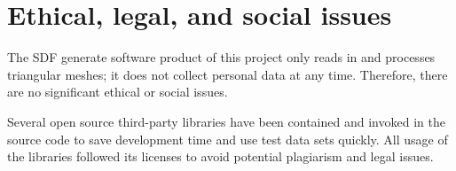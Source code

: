 \clearpage

\section{Ethical, legal, and social issues}

The SDF generate software product of this project only reads in and processes triangular meshes; it does not collect personal data at any time. Therefore, there are no significant ethical or social issues.

\hspace*{\fill}

Several open source third-party libraries have been contained and invoked in the source code to save development time and use test data sets quickly. All usage of the libraries followed its licenses to avoid potential plagiarism and legal issues.